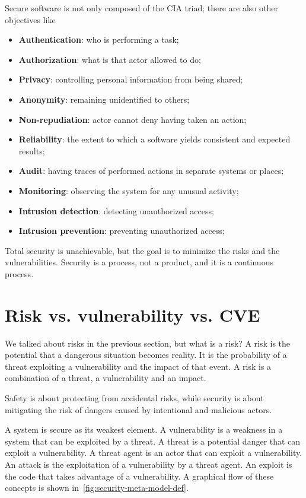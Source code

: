 Secure software is not only composed of the CIA triad; there are also other objectives like~\cite{marchetto-st-slides}
\begin{itemize}
  \item \textbf{Authentication}: who is performing a task;
  \item \textbf{Authorization}: what is that actor allowed to do;
  \item \textbf{Privacy}: controlling personal information from being shared;
  \item \textbf{Anonymity}: remaining unidentified to others;
  \item \textbf{Non-repudiation}: actor cannot deny having taken an action;
  \item \textbf{Reliability}: the extent to which a software yields consistent and expected results;
  \item \textbf{Audit}: having traces of performed actions in separate systems or places;
  \item \textbf{Monitoring}: observing the system for any unusual activity;
  \item \textbf{Intrusion detection}: detecting unauthorized access;
  \item \textbf{Intrusion prevention}: preventing unauthorized access;
\end{itemize}

Total security is unachievable, but the goal is to minimize the risks and the vulnerabilities. Security is a process, not a product, and it is a continuous process.~\cite{marchetto-st-slides}

\section{Risk vs. vulnerability vs. CVE}

We talked about risks in the previous section, but what is a risk? A risk is the potential that a dangerous situation becomes reality. It is the probability of a threat exploiting a vulnerability and the impact of that event. A risk is a combination of a threat, a vulnerability and an impact.

Safety is about protecting from accidental risks, while security is about mitigating the risk of dangers caused by intentional and malicious actors.

A system is secure as its weakest element. A vulnerability is a weakness in a system that can be exploited by a threat. A threat is a potential danger that can exploit a vulnerability. A threat agent is an actor that can exploit a vulnerability. An attack is the exploitation of a vulnerability by a threat agent. An exploit is the code that takes advantage of a vulnerability. A graphical flow of these concepts is shown in~\cref{fig:security-meta-model-def}.

